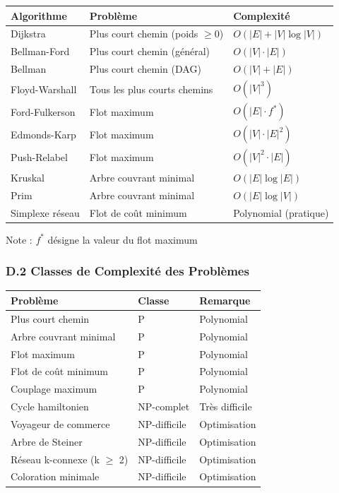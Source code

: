 \documentclass[12pt,a4paper]{article}
\begin{document}
\begin{notecours}
\begin{center}
\begin{tabular}{|l|l|l|}
\hline
\textbf{Algorithme} & \textbf{Problème} & \textbf{Complexité} \\
\hline
\hline
Dijkstra & Plus court chemin (poids $\geq 0$) & $O(|E| + |V| \log |V|)$ \\
\hline
Bellman-Ford & Plus court chemin (général) & $O(|V| \cdot |E|)$ \\
\hline
Bellman & Plus court chemin (DAG) & $O(|V| + |E|)$ \\
\hline
Floyd-Warshall & Tous les plus courts chemins & $O(|V|^3)$ \\
\hline
\hline
Ford-Fulkerson & Flot maximum & $O(|E| \cdot f^*)$ \\
\hline
Edmonds-Karp & Flot maximum & $O(|V| \cdot |E|^2)$ \\
\hline
Push-Relabel & Flot maximum & $O(|V|^2 \cdot |E|)$ \\
\hline
\hline
Kruskal & Arbre couvrant minimal & $O(|E| \log |E|)$ \\
\hline
Prim & Arbre couvrant minimal & $O(|E| \log |V|)$ \\
\hline
\hline
Simplexe réseau & Flot de coût minimum & Polynomial (pratique) \\
\hline
\end{tabular}
\end{center}

Note : $f^*$ désigne la valeur du flot maximum
\end{notecours}

\newpage
\subsubsection*{D.2 Classes de Complexité des Problèmes}

\begin{important}
\begin{center}
\begin{tabular}{|l|l|l|}
\hline
\textbf{Problème} & \textbf{Classe} & \textbf{Remarque} \\
\hline
\hline
Plus court chemin & P & Polynomial \\
\hline
Arbre couvrant minimal & P & Polynomial \\
\hline
Flot maximum & P & Polynomial \\
\hline
Flot de coût minimum & P & Polynomial \\
\hline
Couplage maximum & P & Polynomial \\
\hline
\hline
Cycle hamiltonien & NP-complet & Très difficile \\
\hline
Voyageur de commerce & NP-difficile & Optimisation \\
\hline
Arbre de Steiner & NP-difficile & Optimisation \\
\hline
Réseau k-connexe (k $\geq$ 2) & NP-difficile & Optimisation \\
\hline
Coloration minimale & NP-difficile & Optimisation \\
\hline
\end{tabular}
\end{center}
\end{important}
\end{document}
